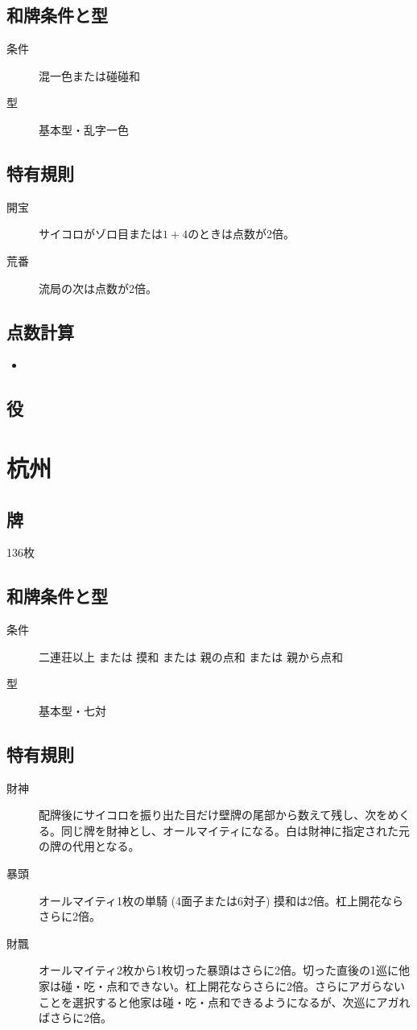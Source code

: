 \documentclass{ltjsarticle}
\begin{document}
\subsection{和牌条件と型}
\begin{description}
    \item[条件] 混一色または碰碰和
    \item[型] 基本型・乱字一色
\end{description}
\subsection{特有規則}
\begin{description}
    \item[開宝] サイコロがゾロ目または$1+4$のときは点数が2倍。
    \item[荒番] 流局の次は点数が2倍。
\end{description}
\subsection{点数計算}
\begin{itemize}
    \item
\end{itemize}
\subsection{役}
\begin{description}
    \item[]
\end{description}
\section{杭州}
\subsection{牌}136枚
\subsection{和牌条件と型}
\begin{description}
    \item[条件] 二連荘以上 または 摸和 または 親の点和 または 親から点和
    \item[型] 基本型・七対
\end{description}
\subsection{特有規則}
\begin{description}
    \item[財神] 配牌後にサイコロを振り出た目だけ壁牌の尾部から数えて残し、次をめくる。同じ牌を財神とし、オールマイティになる。白は財神に指定された元の牌の代用となる。
    \item[暴頭] オールマイティ1枚の単騎 (4面子または6対子) 摸和は2倍。杠上開花ならさらに2倍。
    \item[財飄] オールマイティ2枚から1枚切った暴頭はさらに2倍。切った直後の1巡に他家は碰・吃・点和できない。杠上開花ならさらに2倍。さらにアガらないことを選択すると他家は碰・吃・点和できるようになるが、次巡にアガればさらに2倍。
\end{description}
\end{document}
